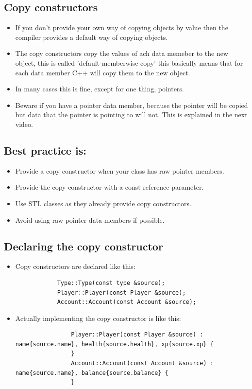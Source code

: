 \subsection{Copy constructors}
\begin{itemize}
    \item If you don't provide your own way of copying objects by value then the compiler provides a default way of copying objects.
    \item The copy constructors copy the values of ach data memeber to the new object, this is called 'default-memberwise-copy' this basically means that for each data member C++ will copy them to the new object.
    \item In many cases this is fine, except for one thing, pointers.
    \item Beware if you have a pointer data member, because the pointer will be copied but data that the pointer is pointing to will not. This is explained in the next video.
\end{itemize}

\subsection{Best practice is:}
\begin{itemize}
    \item Provide a copy constructor when your class has raw pointer members.
    \item Provide the copy constructor with a const reference parameter.
    \item Use STL classes as they already provide copy constructors.
    \item Avoid using raw pointer data members if possible.
\end{itemize}

\subsection{Declaring the copy constructor}
\begin{itemize}
    \item Copy constructors are declared like this:
        \begin{verbatim}
            Type::Type(const type &source);
            Player::Player(const Player &source);
            Account::Account(const Account &source);
        \end{verbatim}
    
    \item Actually implementing the copy constructor is like this:
        \begin{verbatim}
                Player::Player(const Player &source) : name{source.name}, health{source.health}, xp{source.xp} {
                }
                Account::Account(const Account &source) : name{source.name}, balance{source.balance} {
                }
        \end{verbatim}
\end{itemize}

